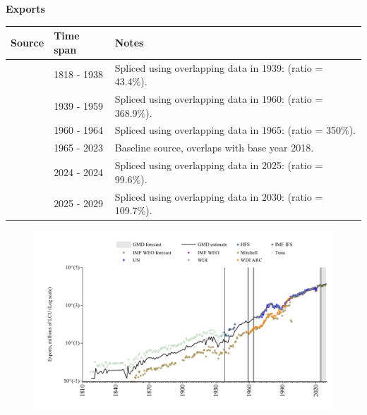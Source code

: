 \documentclass[12pt,a4paper,landscape]{article}
\begin{document}
\begin{adjustbox}{max totalsize={\paperwidth}{\paperheight},center}
\begin{minipage}[t][\textheight][t]{\textwidth}
\vspace*{0.5cm}
{}
\begin{center}
{\Large\bfseries Exports}
\end{center}
\vspace{0.5cm}
\begin{table}[H]
\centering
\small
\begin{tabular}{|l|l|l|}
\hline
\textbf{Source} & \textbf{Time span} & \textbf{Notes} \\
\hline
\rowcolor{white}\cite{Tena}& 1818 - 1938 &Spliced using overlapping data in 1939: (ratio = 43.4\%). \\
\rowcolor{lightgray}\cite{Mitchell}& 1939 - 1959 &Spliced using overlapping data in 1960: (ratio = 368.9\%). \\
\rowcolor{white}\cite{WDI_ARC}& 1960 - 1964 &Spliced using overlapping data in 1965: (ratio = 350\%). \\
\rowcolor{lightgray}\cite{WDI}& 1965 - 2023 &Baseline source, overlaps with base year 2018. \\
\rowcolor{white}\cite{IMF_IFS}& 2024 - 2024 &Spliced using overlapping data in 2025: (ratio = 99.6\%). \\
\rowcolor{lightgray}\cite{IMF_WEO_forecast}& 2025 - 2029 &Spliced using overlapping data in 2030: (ratio = 109.7\%). \\
\hline
\end{tabular}
\end{table}
\begin{figure}[H]
\centering
\includegraphics[width=\textwidth,height=0.6\textheight,keepaspectratio]{graphs/SLV_exports.pdf}
\end{figure}
\end{minipage}
\end{adjustbox}
\end{document}
